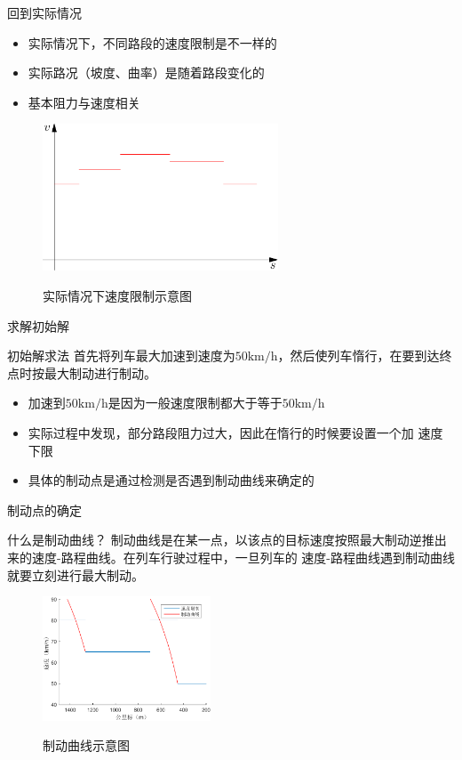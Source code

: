 \documentclass{beamer}
\begin{document}
\begin{frame}{回到实际情况}

\begin{itemize}
  \item 实际情况下，不同路段的速度限制是不一样的
  \item 实际路况（坡度、曲率）是随着路段变化的
  \item 基本阻力与速度相关
\end{itemize}

\begin{figure}
  \centering
  \includegraphics[width=7cm]{fig/fig5/fig5.pdf}\\
  \caption{实际情况下速度限制示意图}
\end{figure}

\end{frame}

\begin{frame}{求解初始解}
\begin{block}{初始解求法}
首先将列车最大加速到速度为$50 \mathrm{km/h}$，然后使列车惰行，在要到达终点时按最大制动进行制动。
\end{block}
\begin{itemize}
  \item<1-> 加速到$50 \mathrm{km/h}$是因为一般速度限制都大于等于$50
      \mathrm{km/h}$
  \item<2-> 实际过程中发现，部分路段阻力过大，因此在惰行的时候要设置一个加
      速度下限
  \item<3-> 具体的制动点是通过检测是否遇到制动曲线来确定的
\end{itemize}
\end{frame}

\begin{frame}{制动点的确定}
\begin{block}{什么是制动曲线？}
制动曲线是在某一点，以该点的目标速度按照最大制动逆推出来的速度-路程曲线。在列车行驶过程中，一旦列车的
速度-路程曲线遇到制动曲线就要立刻进行最大制动。
\end{block}
\begin{figure}
  \centering
  \includegraphics[width=5cm]{fig/fig6/fig6.pdf}\\
  \caption{制动曲线示意图}
\end{figure}

\end{frame}
\end{document}
